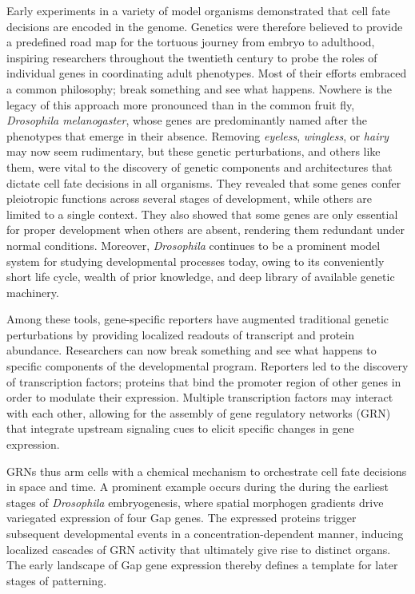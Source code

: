 Early experiments in a variety of model organisms demonstrated that cell fate decisions are encoded in the genome. Genetics were therefore believed to provide a predefined road map for the tortuous journey from embryo to adulthood, inspiring researchers throughout the twentieth century to probe the roles of individual genes in coordinating adult phenotypes. Most of their efforts embraced a common philosophy; break something and see what happens. Nowhere is the legacy of this approach more pronounced than in the common fruit fly, \textit{Drosophila melanogaster}, whose genes are predominantly named after the phenotypes that emerge in their absence. Removing \textit{eyeless}, \textit{wingless}, or \textit{hairy} may now seem rudimentary, but these genetic perturbations, and others like them, were vital to the discovery of genetic components and architectures that dictate cell fate decisions in all organisms. They revealed that some genes confer pleiotropic functions across several stages of development, while others are limited to a single context. They also showed that some genes are only essential for proper development when others are absent, rendering them redundant under normal conditions. Moreover, \emph{Drosophila} continues to be a prominent model system for studying developmental processes today, owing to its conveniently short life cycle, wealth of prior knowledge, and deep library of available genetic machinery.

Among these tools, gene-specific reporters have augmented traditional genetic perturbations by providing localized readouts of transcript and protein abundance. Researchers can now break something and see what happens to specific components of the developmental program. Reporters led to the discovery of transcription factors; proteins that bind the promoter region of other genes in order to modulate their expression. Multiple transcription factors may interact with each other, allowing for the assembly of gene regulatory networks (GRN) that integrate upstream signaling cues to elicit specific changes in gene expression. 

GRNs thus arm cells with a chemical mechanism to orchestrate cell fate decisions in space and time. A prominent example occurs during the during the earliest stages of \textit{Drosophila} embryogenesis, where spatial morphogen gradients drive variegated expression of four Gap genes. The expressed proteins trigger subsequent developmental events in a concentration-dependent manner, inducing localized cascades of GRN activity that ultimately give rise to distinct organs. The early landscape of Gap gene expression thereby defines a template for later stages of patterning.

